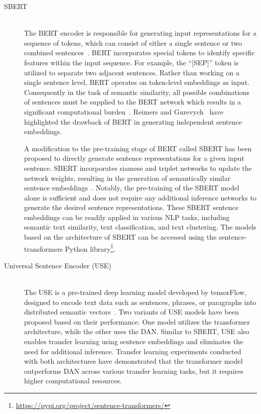 \begin{description}
	\item [\ac{SBERT}]  \hfill \\ The \ac{BERT} encoder is responsible for generating input representations for a sequence of tokens, which can consist of either a single sentence or two combined sentences~\cite{devlin2018bert}. \ac{BERT} incorporates special tokens to identify specific features within the input sequence. For example, the ``[SEP]'' token is utilized to separate two adjacent sentences. Rather than working on a single sentence level, \ac{BERT} operates on token-level embeddings as input. Consequently in the task of semantic similarity, all possible combinations of sentences must be supplied to the \ac{BERT} network which results in a significant computational burden~\cite{reimers-2019-sentence-bert}. Reimers and Gurevych~\cite{reimers-2019-sentence-bert} have highlighted the drawback of \ac{BERT} in generating independent sentence embeddings.
	
	A modification to the pre-training stage of \ac{BERT} called \ac{SBERT} has been proposed to directly generate sentence representations for a given input sentence. \ac{SBERT} incorporates siamese and triplet networks to update the network weights, resulting in the generation of semantically similar sentence embeddings~\cite{reimers-2019-sentence-bert}. Notably, the pre-training of the \ac{SBERT} model alone is sufficient and does not require any additional inference networks to generate the desired sentence representations. These \ac{SBERT} sentence embeddings can be readily applied in various \ac{NLP} tasks, including semantic text similarity, text classification, and text clustering. The models based on the architecture of \ac{SBERT} can be accessed using the sentence-transformers Python library\footnote{\url{https://pypi.org/project/sentence-transformers/}}.
	
	\item [Universal Sentence Encoder (USE)]  \hfill \\ The \ac{USE} is a pre-trained deep learning model developed by tensorFlow, designed to encode text data such as sentences, phrases, or paragraphs into distributed semantic vectors~\cite{cer2018universal}. Two variants of \ac{USE} models have been proposed based on their performance. One model utilizes the transformer architecture, while the other uses the \ac{DAN}. Similar to \ac{SBERT}, \ac{USE} also enables transfer learning using sentence embeddings and eliminates the need for additional inference. Transfer learning experiments conducted with both architectures have demonstrated that the transformer model outperforms \ac{DAN} across various transfer learning tasks, but it requires higher computational resources.
	

\end{description}
